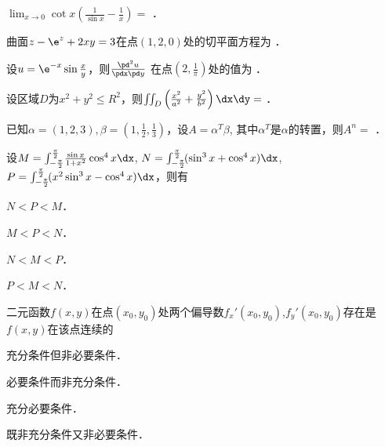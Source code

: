 \documentclass[plain,noanswer,medmath]{../../template/jnuexam}
\begin{document}




\begin{problem}
$\lim_{x \to 0} \cot x\left(\frac{1}{\sin x} - \frac{1}{x} \right) =$ \fillin{}．
\end{problem}


\begin{problem}
曲面$z - \e^z + 2xy = 3$在点$(1,2,0)$处的切平面方程为 \fillin{}．
\end{problem}


\begin{problem}
设$u = \e^{-x}\sin \frac{x}{y}$，则$\frac{\pd^2 u}{\pdx\pd y}$
在点$\left(2,\frac{1}{\pi} \right)$处的值为 \fillin{}．
\end{problem}


\begin{problem}
设区域$D$为$x^2 + y^2 \le R^2$，则$\iint_D \left(\frac{x^2}{a^2} + \frac{y^2}{b^2} \right)\dx\dy =$ \fillin{}．
\end{problem}


\begin{problem}
已知$\alpha = (1,2,3),\beta = \left(1,\frac{1}{2},\frac{1}{3}\right)$，设$A = \alpha^T\beta$,
其中$\alpha^T$是$\alpha$的转置，则$A^n =$ \fillin{}．
\end{problem}




\begin{problem}
设$M = \int_{-\frac{\pi}{2}}^{\frac{\pi}{2}} \!\frac{\sin x}{1 + x^2}\cos^4 x\dx$, 
  $N = \int_{-\frac{\pi}{2}}^{\frac{\pi}{2}} \!(\sin^3 x + \cos^4 x)\dx$, \goodbreak 
  $P = \int_{-\frac{\pi}{2}}^{\frac{\pi}{2}} \!(x^2\sin^3 x - \cos^4 x)\dx$，则有\pickout{}
\begin{abcd}
\item $N < P < M$．                        
\item $M < P < N$．
\item $N < M < P$．                        
\item $P < M < N$．
\end{abcd}
\end{problem}


\begin{problem}
二元函数$f(x,y)$在点$(x_0,y_0)$处两个偏导数$f_x'(x_0,y_0)$,$f_y'(x_0,y_0)$存在是$f(x,y)$在该点连续的\pickout{}
\begin{abcd}
\item 充分条件但非必要条件．         
\item 必要条件而非充分条件．
\item 充分必要条件．                 
\item 既非充分条件又非必要条件．
\end{abcd}
\end{problem}
\end{document}
